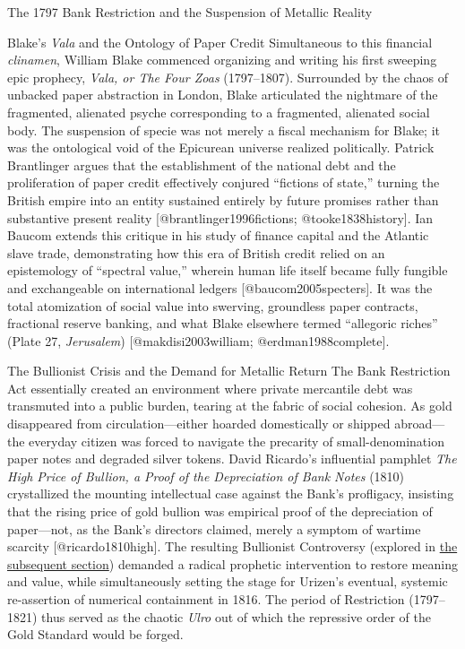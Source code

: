 \documentclass[
  ignorenonframetext,
]{beamer}
\begin{document}
\begin{frame}{The 1797 Bank Restriction and the Suspension of Metallic
Reality}
\begin{block}{Blake's \emph{Vala} and the Ontology of Paper Credit}
\protect{}\label{blakes-vala-and-the-ontology-of-paper-credit}
Simultaneous to this financial \emph{clinamen}, William Blake commenced
organizing and writing his first sweeping epic prophecy, \emph{Vala, or
The Four Zoas} (1797--1807). Surrounded by the chaos of unbacked paper
abstraction in London, Blake articulated the nightmare of the
fragmented, alienated psyche corresponding to a fragmented, alienated
social body. The suspension of specie was not merely a fiscal mechanism
for Blake; it was the ontological void of the Epicurean universe
realized politically. Patrick Brantlinger argues that the establishment
of the national debt and the proliferation of paper credit effectively
conjured ``fictions of state,'' turning the British empire into an
entity sustained entirely by future promises rather than substantive
present reality {[}@brantlinger1996fictions; @tooke1838history{]}. Ian
Baucom extends this critique in his study of finance capital and the
Atlantic slave trade, demonstrating how this era of British credit
relied on an epistemology of ``spectral value,'' wherein human life
itself became fully fungible and exchangeable on international ledgers
{[}@baucom2005specters{]}. It was the total atomization of social value
into swerving, groundless paper contracts, fractional reserve banking,
and what Blake elsewhere termed ``allegoric riches'' (Plate 27,
\emph{Jerusalem}) {[}@makdisi2003william; @erdman1988complete{]}.
\end{block}

\begin{block}{The Bullionist Crisis and the Demand for Metallic Return}
\protect{}\label{the-bullionist-crisis-and-the-demand-for-metallic-return}
The Bank Restriction Act essentially created an environment where
private mercantile debt was transmuted into a public burden, tearing at
the fabric of social cohesion. As gold disappeared from
circulation---either hoarded domestically or shipped abroad---the
everyday citizen was forced to navigate the precarity of
small-denomination paper notes and degraded silver tokens. David
Ricardo's influential pamphlet \emph{The High Price of Bullion, a Proof
of the Depreciation of Bank Notes} (1810) crystallized the mounting
intellectual case against the Bank's profligacy, insisting that the
rising price of gold bullion was empirical proof of the depreciation of
paper---not, as the Bank's directors claimed, merely a symptom of
wartime scarcity {[}@ricardo1810high{]}. The resulting Bullionist
Controversy (explored in
\href{02d_bullionist_controversy.md\#the-bullionist-controversy-and-the-semiotics-of-value}{the
subsequent section}) demanded a radical prophetic intervention to
restore meaning and value, while simultaneously setting the stage for
Urizen's eventual, systemic re-assertion of numerical containment in
1816. The period of Restriction (1797--1821) thus served as the chaotic
\emph{Ulro} out of which the repressive order of the Gold Standard would
be forged.
\end{block}
\end{frame}
\end{document}
